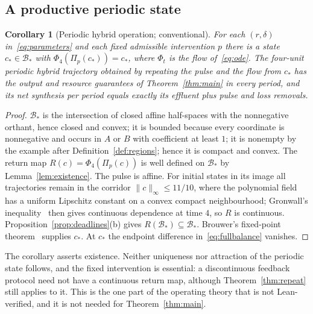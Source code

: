 \documentclass[11pt,a4paper]{article}
\theoremstyle{plain}
\newtheorem{corollary}[theorem]{Corollary}
\theoremstyle{definition}
\theoremstyle{remark}
\newcommand{\Bstar}{\mathcal B_*}
\newcommand{\Pulse}{\Pi}
\newcommand{\Flow}{\Phi}
\begin{document}
\subsection{A productive periodic state}
\begin{corollary}[Periodic hybrid operation; conventional]\label{cor:periodic}
For each $(r,\delta)$ in~\eqref{eq:parameters} and each fixed admissible intervention $p$ there is a state $c_*\in\Bstar$ with $\Flow_4(\Pulse_p(c_*))=c_*$, where $\Flow_t$ is the flow of~\eqref{eq:ode}. The four-unit periodic hybrid trajectory obtained by repeating the pulse and the flow from $c_*$ has the output and resource guarantees of Theorem~\ref{thm:main} in every period, and its net synthesis per period equals exactly its effluent plus pulse and loss removals.
\end{corollary}
\begin{proof}
$\Bstar$ is the intersection of closed affine half-spaces with the nonnegative orthant, hence closed and convex; it is bounded because every coordinate is nonnegative and occurs in $A$ or $B$ with coefficient at least $1$; it is nonempty by the example after Definition~\ref{def:regions}; hence it is compact and convex. The return map $R(c)=\Flow_4(\Pulse_p(c))$ is well defined on $\Bstar$ by Lemma~\ref{lem:existence}. The pulse is affine. For initial states in its image all trajectories remain in the corridor $\|c\|_\infty\le11/10$, where the polynomial field has a uniform Lipschitz constant on a convex compact neighbourhood; Gronwall's inequality~\citep{gronwall1919} then gives continuous dependence at time $4$, so $R$ is continuous. Proposition~\ref{prop:deadlines}(b) gives $R(\Bstar)\subseteq\Bstar$. Brouwer's fixed-point theorem~\citep{granas2003} supplies $c_*$. At $c_*$ the endpoint difference in~\eqref{eq:fullbalance} vanishes.
\end{proof}
The corollary asserts existence. Neither uniqueness nor attraction of the periodic state follows, and the fixed intervention is essential: a discontinuous feedback protocol need not have a continuous return map, although Theorem~\ref{thm:repeat} still applies to it. This is the one part of the operating theory that is not Lean-verified, and it is not needed for Theorem~\ref{thm:main}.
\end{document}
